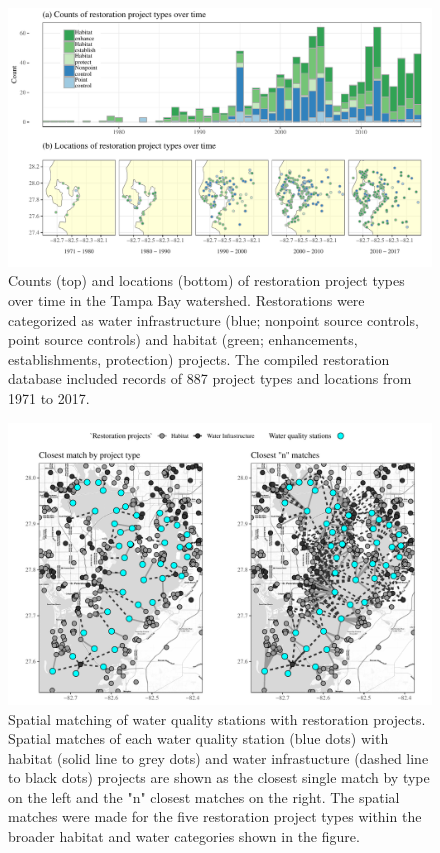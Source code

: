 \documentclass[]{article}
\begin{document}
\clearpage

\begin{figure}
\centerline{\includegraphics[width = \textwidth]{figs/restyrs.pdf}}
\caption{Counts (top) and locations (bottom) of restoration project types over time in the Tampa Bay watershed.  Restorations were categorized as water infrastructure (blue; nonpoint source controls, point source controls) and habitat (green; enhancements, establishments, protection) projects.  The compiled restoration database included records of 887 project types and locations from 1971 to 2017.}
\label{fig:restyrs}
\end{figure}

\clearpage

\begin{figure}
\centerline{\includegraphics[width = \textwidth]{figs/spmtch.pdf}}
\caption{Spatial matching of water quality stations with restoration projects. Spatial matches of each water quality station (blue dots) with habitat (solid line to grey dots) and water infrastucture (dashed line to black dots) projects are shown as the closest single match by type on the left and the "n" closest matches on the right.  The spatial matches were made for the five restoration project types within the broader habitat and water categories shown in the figure.}
\label{fig:spmtch}
\end{figure}
\end{document}
